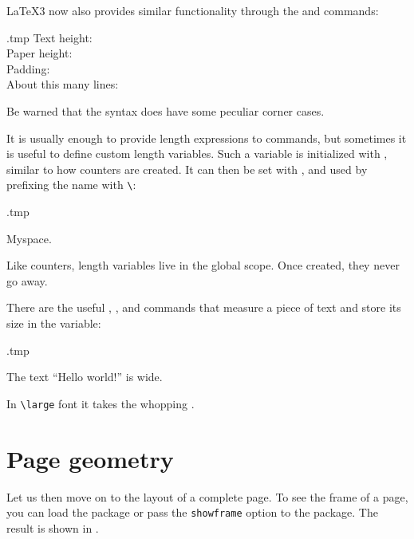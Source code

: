 \begin{latexthree}
\LaTeX3 now also provides similar functionality through the  and  commands:
%
\begin{VerbatimOut}{\jobname.tmp}
Text height: \the\textheight\\
Paper height: \the\paperheight\\
Padding:
\dimeval{\paperheight - \textheight}\\
About this many lines:
\inteval{\textheight / \baselineskip}
\end{VerbatimOut}
\ShowExample
%
Be warned that the syntax does have some peculiar corner cases.
\end{latexthree}


It is usually enough to provide length expressions to commands,
but sometimes it is useful to define custom length variables.
Such a variable is initialized with , similar to how counters are created.
It can then be set with , and used by prefixing the name with \verb|\|:
%
\begin{VerbatimOut}{\jobname.tmp}
\newlength\Mylen
\setlength\Mylen{1.75em}

My\hspace{\Mylen}space.
\end{VerbatimOut}
\ShowExample

\begin{technote}
Like counters, length variables live in the global scope.
Once created, they never go away.
\end{technote}

There are the useful , , and 
commands that measure a piece of text and store its size in the variable:
%
\begin{VerbatimOut}{\jobname.tmp}
\settowidth{}

The text ``Hello world!''
is {\the\Mylen} wide.

\settowidth{}

In \verb|\large| font it takes
the whopping \the\Mylen.
\end{VerbatimOut}
\ShowExample



%
%
%
\section{Page geometry}

Let us then move on to the layout of a complete page.
To see the frame of a page, you can load the  package
or pass the \verb|showframe| option to the  package.
The result is shown in .

